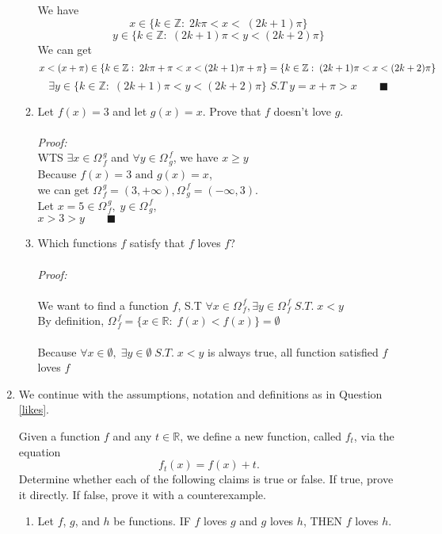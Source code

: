 \documentclass[12pt]{exam}
\newcommand {\DS} [1] {${\displaystyle #1}$}
\newcommand{\vv}{\vspace{.2cm}}
\newcommand{\R}{\mathbb{R}}
\newcommand{\Z}{\mathbb{Z}}
\newcommand{\M}[2]{\Omega^{\, #2}_{\, #1}}
\begin{document}
\begin{enumerate}
\begin{enumerate}
		We have 
		$$
			x \in \{k \in \Z : \; 2k\pi < x < \; (2k + 1)\pi\}
		$$
		$$
			y \in \{k \in \Z : \; (2k + 1)\pi < y < (2k + 2)\pi\}
		$$
		We can get
		$$
		x < (x + \pi) \in \{k \in \Z : \; 2k\pi + \pi < x < (2k + 1)\pi + \pi\}\\ = \{k \in \Z : \; (2k + 1)\pi < x < (2k + 2)\pi\}
		$$
		$$
		\exists y \in \{k \in \Z : \; (2k + 1)\pi < y < (2k + 2)\pi\} \; S.T \; y=x + \pi > x \quad \quad \blacksquare
		$$

		\newpage
		\item  Let \DS{f(x) = 3} and let \DS{g(x) = x}.  Prove that $f$ doesn't love $g$.
		\\
		\\
		\emph{Proof:}
		\\
		WTS $\exists x \in \M{f}{g}$ and $\forall y \in \M{g}{f}$, we have $x \geq y$ \\
		\vv
		Because $f(x) = 3 \mbox{ and } g(x) = x$, \\
		we can get $\M{f}{g} = (3, +\infty), \M{g}{f} = (-\infty, 3)$.\\
		Let $x=5 \in \M{f}{g}, \; y \in \M{g}{f}$, \\
		$x > 3 > y \quad \quad \blacksquare $
		\\
		
		\vv
		\newpage
		
		\item  Which functions $f$ satisfy that $f$ loves $f$? 
		\\
		\\
		\emph{Proof:}
		\\
		\\
		We want to find a function $f$, S.T $\forall x \in \M{f}{f}, \exists y \in \M{f}{f} \; S.T. \; x < y$\\
		By definition, $\M{f}{f}=\{ x \in \R: \; f(x) < f(x)\} = \emptyset$\\
		\\
		Because $\forall x \in \emptyset, \; \exists y \in \emptyset \; S.T. \; x < y$ is always true,
		all function satisfied $f$ loves $f$
		\newpage
		\
	\end{enumerate}
\vv

\item We continue with the assumptions, notation and definitions as in Question \ref{likes}.
	
	Given a function $f$ and any $t \in \R$, we define a new function, called $f_t$, via the equation
	$$
		f_t(x) = f(x) + t.
	$$
	Determine whether each of the following claims is true or false.  If true, prove it directly.  If false, prove it with a counterexample.
	\begin{enumerate}
		\item  Let $f$, $g$, and $h$ be functions. 
				IF $f$ loves $g$ and $g$ loves $h$,
				THEN $f$ loves $h$.
			

\end{enumerate}
\end{enumerate}
\end{document}
